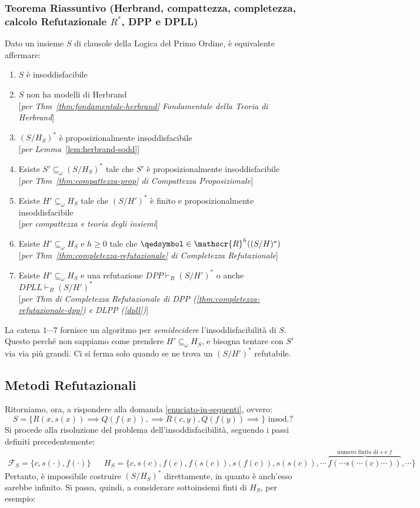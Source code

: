 \subsubsection{Teorema Riassuntivo (Herbrand, compattezza, completezza, calcolo Refutazionale $R^*$, DPP e DPLL)}
Dato un insieme $S$ di clausole della Logica del Primo Ordine, è equivalente affermare:
\begin{enumerate}
  \item $S$ è insoddisfacibile 
  \item $S$ non ha modelli di Herbrand \\
  {[\textit{per Thm~\ref{thm:fondamentale-herbrand} Fondamentale della Teoria di Herbrand}]}
  \item $(S/H_S)^*$ è proposizionalmente insoddisfacibile \\
  {[\textit{per Lemma~}\ref{lem:herbrand-sodd}]}
  \item Esiste $S' \subseteq_{\omega} (S/H_S)^*$ tale che $S'$ è proposizionalmente insoddisfacibile \\
  {[\textit{per Thm~\ref{thm:compattezza-prop} di Compattezza Proposizionale}]}
  \item Esiste $H'\subseteq_{\omega} H_S$ tale che $(S/H')^*$ è finito e proposizionalmente insoddisfacibile \\
  {[\textit{per compattezza e teoria degli insiemi}]}
  \item Esiste $H' \subseteq_{\omega} H_S$ e $h \geq 0$ tale che $\qedsymbol \in \mathscr{R}^h((S/H)^*)$ \\
  {[\textit{per Thm~\ref{thm:completezza-refutazionale} di Completezza Refutazionale}]}
  \item Esiste $H' \subseteq_{\omega} H_S$ e una refutazione $DPP \vdash_R (S/H')^*$ o anche $DPLL \vdash_R (S/H')^*$ \\
  {[\textit{per Thm di Completezza Refutazionale di DPP (\ref{thm:completezza-refutazionale-dpp}) e DLPP (\ref{dpll})}]}
\end{enumerate}
La catena $1 \cdots 7$ fornisce un algoritmo per \textit{semidecidere} l'insoddisfacibilità di $S$. Questo perché non sappiamo come prendere $H' \subseteq_\omega H_S$, e bisogna tentare con $S'$ via via più grandi. Ci si ferma solo quando se ne trova un $(S/H')^*$ refutabile. 

\subsection{Metodi Refutazionali}
Ritorniamo, ora, a rispondere alla domanda \ref{enuciato-in-sequenti}, ovvero: 
$$
  S = \{ R(x,s(x)) \implies Q(f(x)), \implies R(c,y), Q(f(y)) \implies\} \text{ insod.?}
$$
Si procede alla risoluzione del problema dell'insoddisfacibilità, seguendo 
i passi definiti precedentemente: 
\begin{align*}
\mathscr{F}_S = \{c, s(\cdot), f(\cdot)\} &&
H_S = \{c, s(c), f(c), f(s(c)), s(f(c)), s(s(c)), \cdots\, \overbrace{f(\cdots s( \cdots (c) \cdots))}^{\text{numero finito di } s \text{ e } f}, \cdots\}
\end{align*}
Pertanto, è impossibile costruire $(S/H_S)^*$ direttamente, in quanto è anch'esso sarebbe infinito. Si passa, quindi, a considerare sottoinsiemi finti di $H_S$, per esempio:

